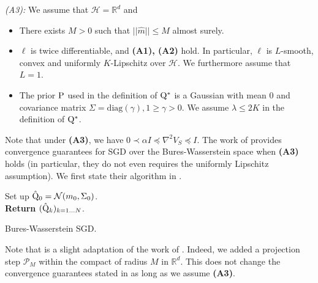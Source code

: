 \textit{(A3):} We assume that $\mathcal{H}=\mathbb{R}^d$ and
\begin{itemize}
  \item There exists $M>0$ such that $||\hat{m}|| \leq M$ almost surely.
  \item $\ell$ is twice differentiable, and \textbf{(A1), (A2)} hold. In particular, $\ell$ is $L$-smooth, convex and uniformly $K$-Lipschitz over $\mathcal{H}$. We furthermore assume that $L=1$.
  \item The prior $\P$ used in the definition of $\Q^*$ is a Gaussian with mean $0$ and covariance matrix $\Sigma= \text{diag}(\gamma), 1\geq\gamma>0$. We assume $\lambda \leq 2K$ in the definition of $\Q^*$.
\end{itemize}
Note that under \textbf{(A3)}, we have $0 \prec \alpha I \preceq \nabla^2 V_S \preceq I$.
The work of \citet[Theorem 4]{lambert2022variational} provides convergence guarantees for SGD over the Bures-Wasserstein space when \textbf{(A3)} holds (in particular, they do not even requires the uniformly Lipschitz assumption). We first state their algorithm in .
\begin{algorithm}[ht]
\SetAlgoLined
{}
Set up $\hat{\Q}_0 = \mathcal{N}(m_0,\Sigma_0)$. \\
\textbf{Return} $(\hat{\Q}_k)_{k=1...N}$.
\caption{Bures-Wasserstein SGD.}
\label{alg: sgd}
\end{algorithm}
Note that  is a slight adaptation of the work of \citet{lambert2022variational}. Indeed, we added a projection step $\mathcal{P}_M$  within the compact of radius $M$ in $\mathbb{R}^d$. This does not change the convergence guarantees stated in  as long as we assume \textbf{(A3)}.

